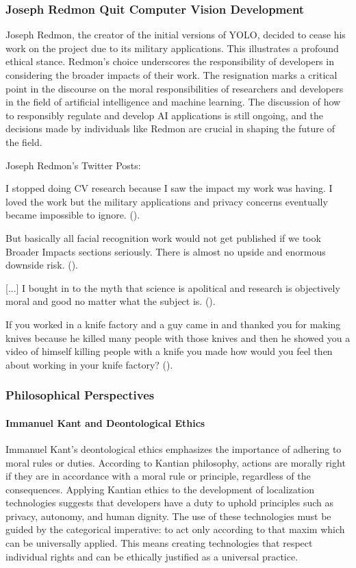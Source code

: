 \subsubsection{Joseph Redmon Quit Computer Vision Development}
Joseph Redmon, the creator of the initial versions of YOLO, decided to cease his work on the project due to its military applications. This illustrates a profound ethical stance. Redmon's choice underscores the responsibility of developers in considering the broader impacts of their work. The resignation marks a critical point in the discourse on the moral responsibilities of researchers and developers in the field of artificial intelligence and machine learning. The discussion of how to responsibly regulate and develop AI applications is still ongoing, and the decisions made by individuals like Redmon are crucial in shaping the future of the field. 

Joseph Redmon's Twitter Posts:

\begin{myquote}
    I stopped doing CV research because I saw the impact my work was having. I loved the work but the military applications and privacy concerns eventually became impossible to ignore. (\cite{re2020twitter_feb}).

    But basically all facial recognition work would not get published if we took Broader Impacts sections seriously. There is almost no upside and enormous downside risk. (\cite{re2020twitter_feb}).

    [...] I bought in to the myth that science is apolitical and research is objectively moral and good no matter what the subject is. (\cite{re2020twitter_feb}).

    If you worked in a knife factory and a guy came in and thanked you for making knives because he killed many people with those knives and then he showed you a video of himself killing people with a knife you made how would you feel then about working in your knife factory?  (\cite{re2020twitter_june}).
\end{myquote}

\subsubsection{Philosophical Perspectives}

\paragraph{Immanuel Kant and Deontological Ethics}
Immanuel Kant's deontological ethics emphasizes the importance of adhering to moral rules or duties. According to Kantian philosophy, actions are morally right if they are in accordance with a moral rule or principle, regardless of the consequences. Applying Kantian ethics to the development of localization technologies suggests that developers have a duty to uphold principles such as privacy, autonomy, and human dignity. The use of these technologies must be guided by the categorical imperative: to act only according to that maxim which can be universally applied. This means creating technologies that respect individual rights and can be ethically justified as a universal practice. 


